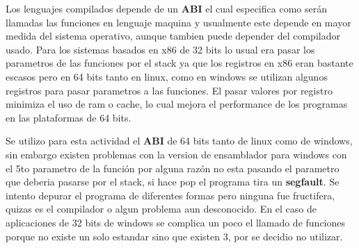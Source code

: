 Los lenguajes compilados depende de un \textbf{ABI} el cual especifica
como serán llamadas las funciones en lenguaje maquina y usualmente
este depende en mayor medida del sistema operativo, aunque tambien puede
depender del compilador usado. Para los sistemas basados en x86 de 32 bits
lo usual era pasar los parametros de las funciones por el stack ya que
los registros en x86 eran bastante escasos pero en 64 bits tanto en linux,
como en windows se utilizan algunos registros para pasar parametros a las
funciones. El pasar valores por registro minimiza el uso de ram o cache, lo
cual mejora el performance de los programas en las plataformas de 64 bits.

Se utilizo para esta actividad el \textbf{ABI} de 64 bits tanto de linux
como de windows, sin embargo existen problemas con la version de ensamblador
para windows con el 5to parametro de la función por alguna razón no esta
pasando el parametro que deberia pasarse por el stack, si hace pop el programa
tira un \textbf{segfault}. Se intento depurar el programa de diferentes
formas pero ninguna fue fructifera, quizas es el compilador o algun problema
aun desconocido. En el caso de aplicaciones de 32 bits de windows se complica un
poco el llamado de funciones porque no existe un solo estandar sino que existen
3, por se decidio no utilizar.
